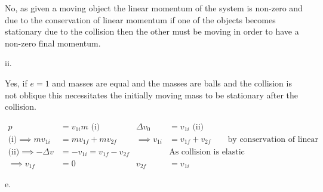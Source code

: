 \documentclass[12pt]{article}
\begin{document}
    No, as given a moving object the linear momentum of the system is non-zero and due to the conservation of linear momentum if one of the objects becomes stationary due to the collision then the other must be moving in order to have a non-zero final momentum.

    ii.

    Yes, if $e=1$ and masses are equal and the masses are balls and the collision is not oblique this necessitates the initially moving mass to be stationary after the collision.

    \begin{equation*}
        \begin{alignedat}{2}
            p&=v_{1i}m\text{ (i)}\qquad&\Delta v_0&=v_{1i}\text{ (ii)}\\
            \text{(i)}\implies mv_{1i}&=mv_{1f}+mv_{2f} &\implies v_{1i}&=v_{1f}+v_{2f}\qquad\text{by conservation of linear momentum}\\
            \text{(ii)}\implies -\Delta v&=-v_{1i}=v_{1f}-v_{2f}&&\text{As collision is elastic}\\
            \implies v_{1f}&=0\qquad&v_{2f}&=v_{1i}
        \end{alignedat}
    \end{equation*}

    e.

\end{document}
